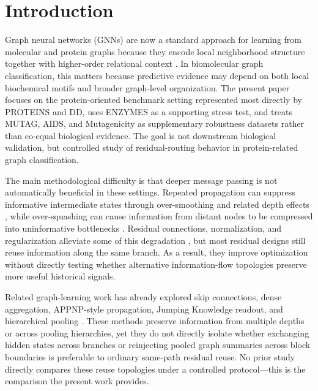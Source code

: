 \section{Introduction}

Graph neural networks (GNNs) are now a standard approach for learning from molecular and protein graphs because they encode local neighborhood structure together with higher-order relational context \cite{kipf2016semi,gilmer2017neural,hamilton2017inductive,wu2020comprehensive,zhou2020graph}. In biomolecular graph classification, this matters because predictive evidence may depend on both local biochemical motifs and broader graph-level organization. The present paper focuses on the protein-oriented benchmark setting represented most directly by PROTEINS and DD, uses ENZYMES as a supporting stress test, and treats MUTAG, AIDS, and Mutagenicity as supplementary robustness datasets rather than co-equal biological evidence. The goal is not downstream biological validation, but controlled study of residual-routing behavior in protein-related graph classification.

The main methodological difficulty is that deeper message passing is not automatically beneficial in these settings. Repeated propagation can suppress informative intermediate states through over-smoothing and related depth effects \cite{li2018deeper,oono2020simple,chen2023revisiting}, while over-squashing can cause information from distant nodes to be compressed into uninformative bottlenecks \cite{alon2020bottleneck,topping2021understanding}. Residual connections, normalization, and regularization alleviate some of this degradation \cite{he2016deep,bresson2017residual,zhao2020pair,cai2021graphnorm,rong2019dropedge,chenSimpleDeepGraph2020}, but most residual designs still reuse information along the same branch. As a result, they improve optimization without directly testing whether alternative information-flow topologies preserve more useful historical signals.

Related graph-learning work has already explored skip connections, dense aggregation, APPNP-style propagation, Jumping Knowledge readout, and hierarchical pooling \cite{xu2018representation,klicpera2018combining,gao2019graph,ying2018hierarchical}. These methods preserve information from multiple depths or across pooling hierarchies, yet they do not directly isolate whether exchanging hidden states across branches or reinjecting pooled graph summaries across block boundaries is preferable to ordinary same-path residual reuse. No prior study directly compares these reuse topologies under a controlled protocol---this is the comparison the present work provides.

